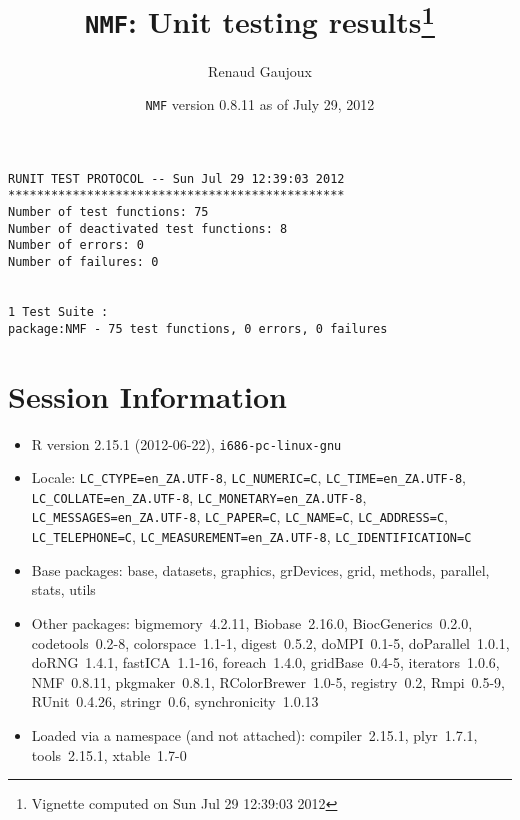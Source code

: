 \documentclass[10pt]{article}
\author{Renaud Gaujoux}
\title{\texttt{NMF}: Unit testing results\footnote{Vignette computed  on Sun Jul 29 12:39:03 2012}}
\date{\texttt{NMF} version 0.8.11 as of July 29, 2012}
\begin{document}
\maketitle

\begin{verbatim}
RUNIT TEST PROTOCOL -- Sun Jul 29 12:39:03 2012 
*********************************************** 
Number of test functions: 75 
Number of deactivated test functions: 8 
Number of errors: 0 
Number of failures: 0 

 
1 Test Suite : 
package:NMF - 75 test functions, 0 errors, 0 failures
\end{verbatim}

\section*{Session Information}
\begin{itemize}\raggedright
  \item R version 2.15.1 (2012-06-22), \verb|i686-pc-linux-gnu|
  \item Locale: \verb|LC_CTYPE=en_ZA.UTF-8|, \verb|LC_NUMERIC=C|, \verb|LC_TIME=en_ZA.UTF-8|, \verb|LC_COLLATE=en_ZA.UTF-8|, \verb|LC_MONETARY=en_ZA.UTF-8|, \verb|LC_MESSAGES=en_ZA.UTF-8|, \verb|LC_PAPER=C|, \verb|LC_NAME=C|, \verb|LC_ADDRESS=C|, \verb|LC_TELEPHONE=C|, \verb|LC_MEASUREMENT=en_ZA.UTF-8|, \verb|LC_IDENTIFICATION=C|
  \item Base packages: base, datasets, graphics, grDevices, grid,
    methods, parallel, stats, utils
  \item Other packages: bigmemory~4.2.11, Biobase~2.16.0,
    BiocGenerics~0.2.0, codetools~0.2-8, colorspace~1.1-1,
    digest~0.5.2, doMPI~0.1-5, doParallel~1.0.1, doRNG~1.4.1,
    fastICA~1.1-16, foreach~1.4.0, gridBase~0.4-5, iterators~1.0.6,
    NMF~0.8.11, pkgmaker~0.8.1, RColorBrewer~1.0-5, registry~0.2,
    Rmpi~0.5-9, RUnit~0.4.26, stringr~0.6, synchronicity~1.0.13
  \item Loaded via a namespace (and not attached): compiler~2.15.1,
    plyr~1.7.1, tools~2.15.1, xtable~1.7-0
\end{itemize}
\end{document}
